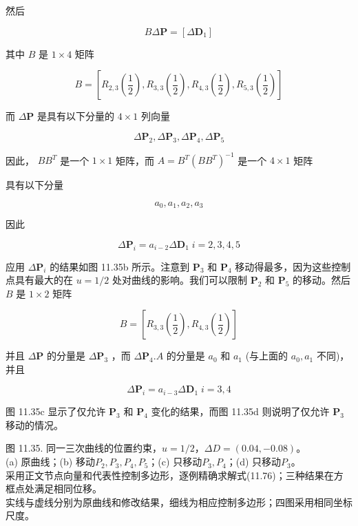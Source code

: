 \documentclass[../main.tex]{subfiles}
\begin{document}
然后

\[
{B\Delta }\mathbf{P} = \left\lbrack  {\Delta {\mathbf{D}}_{1}}\right\rbrack
\]

其中 \(B\) 是 \(1 \times  4\) 矩阵

\[
B = \left\lbrack  {{R}_{2,3}\left( \frac{1}{2}\right) ,{R}_{3,3}\left( \frac{1}{2}\right) ,{R}_{4,3}\left( \frac{1}{2}\right) ,{R}_{5,3}\left( \frac{1}{2}\right) }\right\rbrack
\]

而 \(\Delta \mathbf{P}\) 是具有以下分量的 \(4 \times  1\) 列向量

\[
\Delta {\mathbf{P}}_{2},\Delta {\mathbf{P}}_{3},\Delta {\mathbf{P}}_{4},\Delta {\mathbf{P}}_{5}
\]

因此， \(B{B}^{T}\) 是一个 \(1 \times  1\) 矩阵，而 \(A = {B}^{T}{\left( B{B}^{T}\right) }^{-1}\) 是一个 \(4 \times  1\) 矩阵


具有以下分量

\[
{a}_{0},{a}_{1},{a}_{2},{a}_{3}
\]

因此

\[
\Delta {\mathbf{P}}_{i} = {a}_{i - 2}\Delta {\mathbf{D}}_{1}\;i = 2,3,4,5
\]

应用 \(\Delta {\mathbf{P}}_{i}\) 的结果如图 11.35b 所示。注意到 \({\mathbf{P}}_{3}\) 和 \({\mathbf{P}}_{4}\) 移动得最多，因为这些控制点具有最大的在 \(u = 1/2\) 处对曲线的影响。我们可以限制 \({\mathbf{P}}_{2}\) 和 \({\mathbf{P}}_{5}\) 的移动。然后 \(B\) 是 \(1 \times  2\) 矩阵

\[
B = \left\lbrack  {{R}_{3,3}\left( \frac{1}{2}\right) ,{R}_{4,3}\left( \frac{1}{2}\right) }\right\rbrack
\]

并且 \(\Delta \mathbf{P}\) 的分量是 \(\Delta {\mathbf{P}}_{3}\) ，而 \(\Delta {\mathbf{P}}_{4}.A\) 的分量是 \({a}_{0}\) 和 \({a}_{1}\) (与上面的 \({a}_{0},{a}_{1}\) 不同)，并且

\[
\Delta {\mathbf{P}}_{i} = {a}_{i - 3}\Delta {\mathbf{D}}_{1}\;i = 3,4
\]

图 11.35c 显示了仅允许 \({\mathbf{P}}_{3}\) 和 \({\mathbf{P}}_{4}\) 变化的结果，而图 11.35d 则说明了仅允许 \({\mathbf{P}}_{3}\) 移动的情况。

\begin{center}
\begin{minipage}{37cm}
\centering
{}
\par\medskip
{}
\par\smallskip
图 11.35. 同一三次曲线的位置约束，$u=1/2$，$\Delta D=(0.04,-0.08)$。\\
(a) 原曲线；(b) 移动$P_2,P_3,P_4,P_5$；(c) 只移动$P_3,P_4$；(d) 只移动$P_3$。\\
采用正文节点向量和代表性控制多边形，逐例精确求解式(11.76)；三种结果在方框点处满足相同位移。\\
实线与虚线分别为原曲线和修改结果，细线为相应控制多边形；四图采用相同坐标尺度。
\end{minipage}
\end{center}
\end{document}
